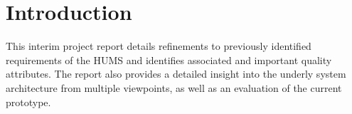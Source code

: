 \section{Introduction}
\label{sec:introduction}

This interim project report details refinements to previously identified requirements of the HUMS and identifies associated and important quality attributes. The report also provides a detailed insight into the underly
system architecture from multiple viewpoints, as well as an evaluation of the current prototype.


